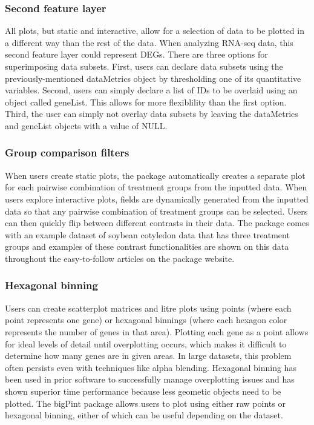\documentclass{bmcart}
\begin{document}
\subsubsection*{Second feature layer}

All plots, but static and interactive, allow for a selection of data to be plotted in a different way than the rest of the data. When analyzing RNA-seq data, this second feature layer could represent DEGs. There are three options for superimposing data subsets. First, users can declare data subsets using the previously-mentioned dataMetrics object by thresholding one of its quantitative variables. Second, users can simply declare a list of IDs to be overlaid using an object called geneList. This allows for more flexiblility than the first option. Third, the user can simply not overlay data subsets by leaving the dataMetrics and geneList objects with a value of NULL.

\subsubsection*{Group comparison filters}

When users create static plots, the package automatically creates a separate plot for each pairwise combination of treatment groups from the inputted data. When users explore interactive plots, fields are dynamically generated from the inputted data so that any pairwise combination of treatment groups can be selected. Users can then quickly flip between different contrasts in their data. The package comes with an example dataset of soybean cotyledon data that has three treatment groups and examples of these contrast functionalities are shown on this data throughout the easy-to-follow articles on the package website. 

\subsubsection*{Hexagonal binning}

Users can create scatterplot matrices and litre plots using points (where each point represents one gene) or hexagonal binnings (where each hexagon color represents the number of genes in that area). Plotting each gene as a point allows for ideal levels of detail until overplotting occurs, which makes it difficult to determine how many genes are in given areas. In large datasets, this problem often persists even with techniques like alpha blending. Hexagonal binning has been used in prior software to successfully manage overplotting issues \cite{carr1987scatterplot, harshbarger2017deiva} and has shown superior time performance because less geometic objects need to be plotted. The bigPint package allows users to plot using either raw points or hexagonal binning, either of which can be useful depending on the dataset.
\end{document}
